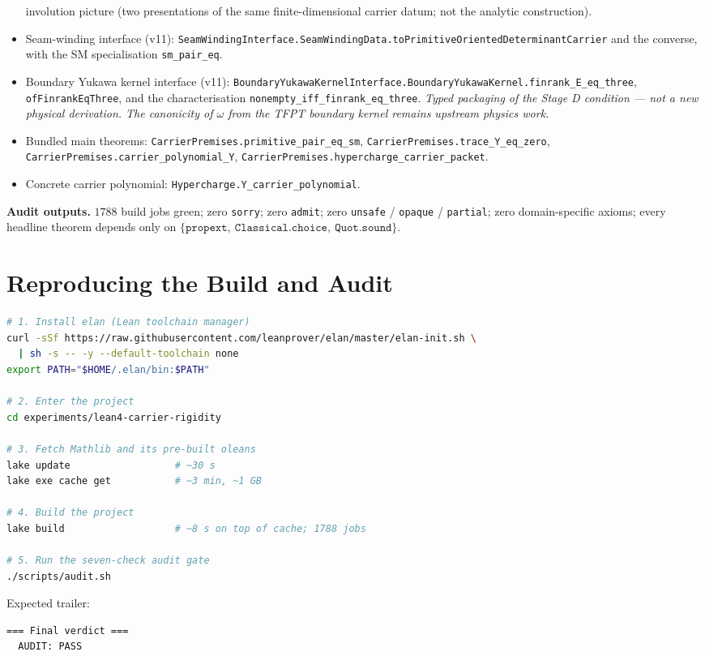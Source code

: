\documentclass[11pt,a4paper]{article}
\begin{document}
\begin{tfptexports}
\begin{itemize}[leftmargin=1.5em, itemsep=0pt]
  involution picture (two presentations of the same
  finite-dimensional carrier datum; not the analytic
  construction).
\item Seam-winding interface (v11):
  \texttt{SeamWindingInterface.SeamWindingData.toPrimitiveOrientedDeterminantCarrier}
  and the converse, with the SM specialisation
  \texttt{sm\_pair\_eq}.
\item Boundary Yukawa kernel interface (v11):
  \texttt{BoundaryYukawaKernelInterface.BoundaryYukawaKernel.finrank\_E\_eq\_three},
  \texttt{ofFinrankEqThree}, and the characterisation
  \texttt{nonempty\_iff\_finrank\_eq\_three}. \emph{Typed
  packaging of the Stage D condition --- not a new physical
  derivation. The canonicity of $\omega$ from the TFPT
  boundary kernel remains upstream physics work.}
\item Bundled main theorems:
  \texttt{CarrierPremises.primitive\_pair\_eq\_sm},
  \texttt{CarrierPremises.trace\_Y\_eq\_zero},
  \texttt{CarrierPremises.carrier\_polynomial\_Y},
  \texttt{CarrierPremises.hypercharge\_carrier\_packet}.
\item Concrete carrier polynomial:
  \texttt{Hypercharge.Y\_carrier\_polynomial}.
\end{itemize}

\textbf{Audit outputs.}
$1788$ build jobs green; zero \texttt{sorry}; zero
\texttt{admit}; zero \texttt{unsafe} / \texttt{opaque} /
\texttt{partial}; zero domain-specific axioms; every headline
theorem depends only on
$\{\texttt{propext},\ \texttt{Classical.choice},\ \texttt{Quot.sound}\}$.
\end{tfptexports}

\appendix
\section{Reproducing the Build and Audit}

\begin{lstlisting}[language=bash]
# 1. Install elan (Lean toolchain manager)
curl -sSf https://raw.githubusercontent.com/leanprover/elan/master/elan-init.sh \
  | sh -s -- -y --default-toolchain none
export PATH="$HOME/.elan/bin:$PATH"

# 2. Enter the project
cd experiments/lean4-carrier-rigidity

# 3. Fetch Mathlib and its pre-built oleans
lake update                  # ~30 s
lake exe cache get           # ~3 min, ~1 GB

# 4. Build the project
lake build                   # ~8 s on top of cache; 1788 jobs

# 5. Run the seven-check audit gate
./scripts/audit.sh
\end{lstlisting}

Expected trailer:

\begin{lstlisting}
=== Final verdict ===
  AUDIT: PASS
\end{lstlisting}
\end{document}
